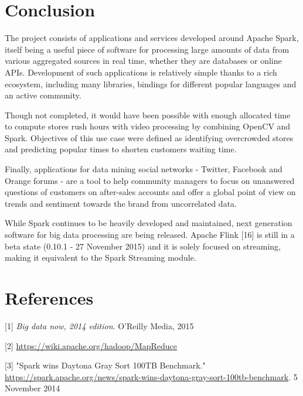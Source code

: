 \documentclass[11pt]{article}
\begin{document}
\section{Conclusion}

The project consists of applications and services developed around \textsf{Apache Spark}, itself being a useful piece of software for processing large amounts of data from various aggregated sources in real time, whether they are databases or online APIs. Development of such applications is relatively simple thanks to a rich ecosystem, including many libraries, bindings for different popular languages and an active community.

Though not completed, it would have been possible with enough allocated time to compute stores rush hours with video processing by combining \textsf{OpenCV} and \textsf{Spark}. Objectives of this use case were defined as identifying overcrowded stores and predicting popular times to shorten customers waiting time.
\vspace{4pt}

Finally, applications for data mining social networks - \textsf{Twitter}, \textsf{Facebook} and \textsf{Orange} forums - are a tool to help community managers to focus on unanswered questions of customers on after-sales accounts and offer a global point of view on trends and sentiment towards the brand from uncorrelated data.
\vspace{4pt}

While \textsf{Spark} continues to be heavily developed and maintained, next generation software for big data processing are being released. \textsf{Apache Flink} [16] is still in a beta state (0.10.1 - 27 November 2015) and it is solely focused on streaming, making it equivalent to the \textsf{Spark Streaming} module.

\section{References}



[1] \textit{Big data now, 2014 edition}. O'Reilly Media, 2015
\vspace{1pt}

[2] \url{https://wiki.apache.org/hadoop/MapReduce}
\vspace{1pt}

[3] "Spark wins Daytona Gray Sort 100TB Benchmark." \url{https://spark.apache.org/news/spark-wins-daytona-gray-sort-100tb-benchmark}. 5 November 2014
\vspace{1pt}
\end{document}

